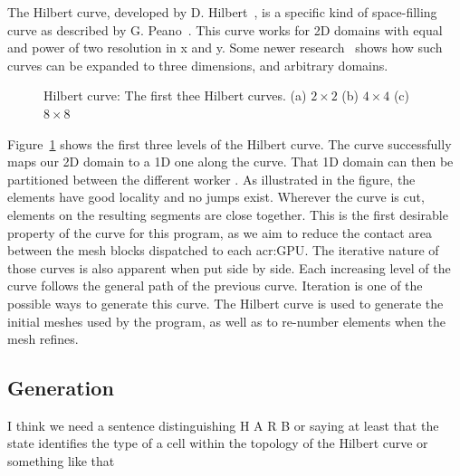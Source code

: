 The Hilbert curve, developed by D. Hilbert~\cite{Hilbert1891}, is a specific kind of space-filling
curve as described by G. Peano~\cite{Peano1890}. This curve works for 2D domains with equal and
power of two resolution in x and y. Some newer research~\cite{Haverkort2011} shows how such curves
can be expanded to three dimensions, and arbitrary domains.

\begin{figure}[H]
    \centering
    \hfill
    \hfill
    \caption{Hilbert curve: The first thee Hilbert curves. (a) \(2\times2\) (b) \(4\times4\) (c) \(8\times8\)}\label{fig:hilbert_curves}
\end{figure}

Figure~\ref{fig:hilbert_curves} shows the first three levels of the Hilbert curve. The curve
successfully maps our 2D domain to a 1D one along the curve. That 1D domain can then be partitioned
between the different worker . As illustrated in the figure, the elements have
good locality and no jumps exist. Wherever the curve is cut, elements on the resulting segments are
close together. This is the first desirable property of the curve for this program, as we aim to
reduce the contact area between the mesh blocks dispatched to each \acrshort{acr:GPU}. The iterative
nature of those curves is also apparent when put side by side. Each increasing level of the curve
follows the general path of the previous curve. Iteration is one of the possible ways to generate
this curve. The Hilbert curve is used to generate the initial meshes used by the program, as well as
to re-number elements when the mesh refines.

\subsection{Generation}\label{subsection:load_balancing:hilbert_curve:generation}

I think we need a sentence distinguishing H A R B or saying at least that the state identifies the 
type of a cell within the topology of the Hilbert curve or something like that


